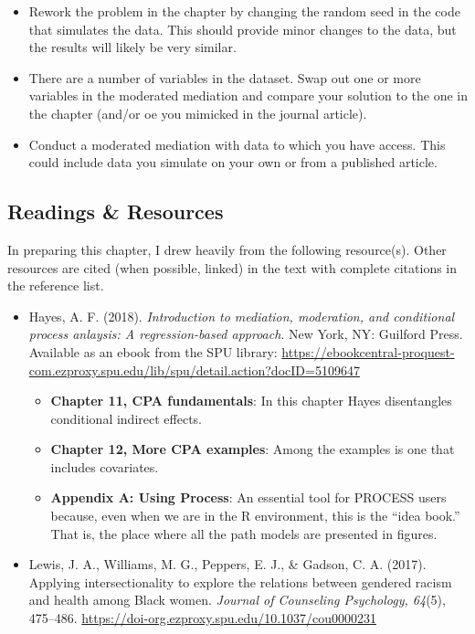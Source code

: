 \documentclass[
  11pt,
]{book}
\providecommand{\tightlist}{%
  \setlength{\itemsep}{0pt}\setlength{\parskip}{0pt}}
\begin{document}
\begin{itemize}
\tightlist
\item
  Rework the problem in the chapter by changing the random seed in the code that simulates the data. This should provide minor changes to the data, but the results will likely be very similar.
\item
  There are a number of variables in the dataset. Swap out one or more variables in the moderated mediation and compare your solution to the one in the chapter (and/or oe you mimicked in the journal article).
\item
  Conduct a moderated mediation with data to which you have access. This could include data you simulate on your own or from a published article.
\end{itemize}

\hypertarget{readings-resources-7}{%
\subsection{Readings \& Resources}\label{readings-resources-7}}

In preparing this chapter, I drew heavily from the following resource(s). Other resources are cited (when possible, linked) in the text with complete citations in the reference list.

\begin{itemize}
\tightlist
\item
  Hayes, A. F. (2018). \emph{Introduction to mediation, moderation, and conditional process anlaysis: A regression-based approach}. New York, NY: Guilford Press. Available as an ebook from the SPU library: \url{https://ebookcentral-proquest-com.ezproxy.spu.edu/lib/spu/detail.action?docID=5109647}

  \begin{itemize}
  \tightlist
  \item
    \textbf{Chapter 11, CPA fundamentals}: In this chapter Hayes disentangles conditional indirect effects.
  \item
    \textbf{Chapter 12, More CPA examples}: Among the examples is one that includes covariates.\\
  \item
    \textbf{Appendix A: Using Process}: An essential tool for PROCESS users because, even when we are in the R environment, this is the ``idea book.'' That is, the place where all the path models are presented in figures.
  \end{itemize}
\item
  Lewis, J. A., Williams, M. G., Peppers, E. J., \& Gadson, C. A. (2017). Applying intersectionality to explore the relations between gendered racism and health among Black women. \emph{Journal of Counseling Psychology, 64}(5), 475--486. \url{https://doi-org.ezproxy.spu.edu/10.1037/cou0000231}
\end{itemize}
\end{document}
